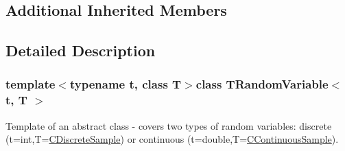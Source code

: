 \subsection*{Additional Inherited Members}


\subsection{Detailed Description}
\subsubsection*{template$<$typename t, class T$>$class T\-Random\-Variable$<$ t, T $>$}

Template of an abstract class -\/ covers two types of random variables\-: discrete (t=int,T=\hyperlink{class_c_discrete_sample}{C\-Discrete\-Sample}) or continuous (t=double,T=\hyperlink{class_c_continuous_sample}{C\-Continuous\-Sample}). 

